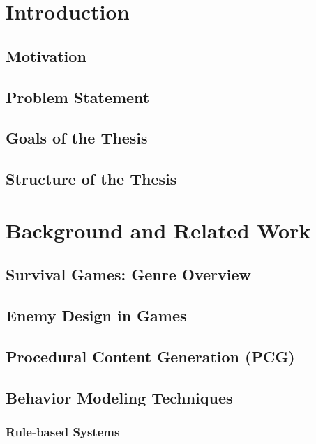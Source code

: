 \documentclass[12pt, twoside, openany]{book}
\begin{document}
	
	
	
	\newpage 
	\tableofcontents
	
	
	
	\newpage 
	\listoffigures
	\listoftables
	
	
	
	\mainmatter
	
	\chapter{Introduction}
	\section{Motivation}
	\section{Problem Statement}
	\section{Goals of the Thesis}
	\section{Structure of the Thesis}
	
	\chapter{Background and Related Work}
	\section{Survival Games: Genre Overview}
	\section{Enemy Design in Games}
	\section{Procedural Content Generation (PCG)}
	\section{Behavior Modeling Techniques}
	\subsection{Rule-based Systems}
\end{document}
